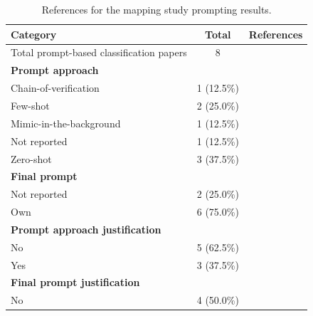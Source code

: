 \documentclass[a4paper]{article}
\begin{document}
\begin{appendices}
\begin{table}[ht]
	\caption{References for the mapping study prompting results.}
	\begin{tabularx}{\textwidth}{|l|c|X|}
		\hline
		\textbf{Category} & \textbf{Total} & \textbf{References} \\
		\hline
		Total prompt-based classification papers & 8 & \cite{10.1145/3597503.3639117,10.1145/3597503.3639194,10.1145/3663529.3663785,10.1145/3663529.3663794,10648982,10659742,10746847,10599336} \\
		\hline
		\textbf{Prompt approach} && \\
		\hspace{3mm} Chain-of-verification & 1 (12.5\%) & \cite{10.1145/3597503.3639194} \\
		\hspace{3mm} Few-shot & 2 (25.0\%) & \cite{10746847,10599336} \\
		\hspace{3mm} Mimic-in-the-background & 1 (12.5\%) & \cite{10.1145/3597503.3639117} \\
		\hspace{3mm} Not reported & 1 (12.5\%) & \cite{10.1145/3663529.3663785} \\
		\hspace{3mm} Zero-shot & 3 (37.5\%) & \cite{10.1145/3663529.3663794,10648982,10659742} \\
		\textbf{Final prompt} && \\
		\hspace{3mm} Not reported & 2 (25.0\%) & \cite{10.1145/3663529.3663785,10746847} \\
		\hspace{3mm} Own & 6 (75.0\%) & \cite{10.1145/3597503.3639117,10.1145/3597503.3639194,10.1145/3663529.3663794,10648982,10659742,10599336} \\
		\textbf{Prompt approach justification} && \\
		\hspace{3mm} No & 5 (62.5\%) & \cite{10.1145/3663529.3663785,10.1145/3663529.3663794,10648982,10659742,10746847} \\
		\hspace{3mm} Yes & 3 (37.5\%) & \cite{10.1145/3597503.3639117,10.1145/3597503.3639194,10599336} \\
		\textbf{Final prompt justification} && \\
		\hspace{3mm} No & 4 (50.0\%) & \cite{10.1145/3597503.3639194,10.1145/3663529.3663785,10648982,10746847} \\

\end{tabularx}
\end{table}
\end{appendices}
\end{document}
